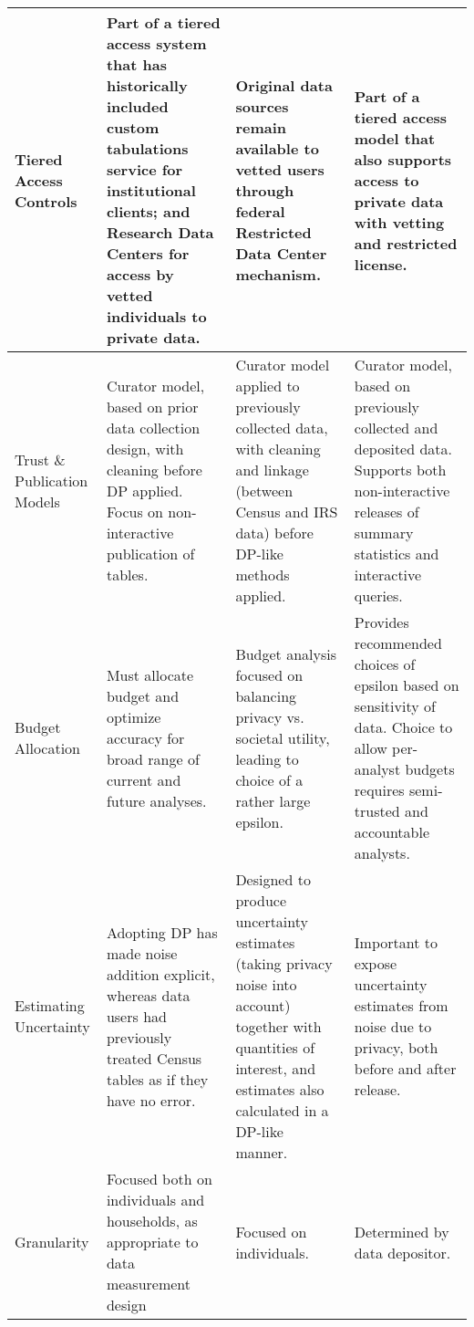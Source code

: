 \begin{table}[p]
\begin{tabularx}{1\textwidth}{P{.45in}YYY}
\midrule
Tiered Access Controls &
Part of a tiered access system that has historically included custom tabulations service for institutional clients; and Research Data Centers for access by vetted individuals to private data. &
Original data sources remain available to vetted users through federal Restricted Data Center mechanism. &
 Part of a tiered access model that also supports access to private data with vetting and restricted license. \\
\midrule
Trust \& Publication Models &
Curator model, based on prior data collection design, with cleaning before DP applied. Focus on non-interactive publication of tables. &
Curator model applied to previously collected data, with cleaning and linkage (between Census and IRS data) before DP-like methods applied. &
Curator model, based on previously collected and deposited data. Supports both non-interactive releases of summary statistics and interactive queries. \\
\midrule
Budget Allocation &
Must allocate budget and optimize accuracy for broad range of current and  future  analyses. &
Budget analysis focused on balancing privacy vs. societal utility, leading to choice of a rather large epsilon. &
Provides recommended choices of epsilon based on sensitivity of data. Choice to allow per-analyst budgets requires semi-trusted and accountable analysts.\\
\midrule
Estimating Uncertainty &
Adopting DP has made noise addition explicit, whereas data users had previously treated Census tables as if they have no error. &
Designed to produce uncertainty estimates (taking privacy noise into account) together with quantities of interest, and estimates also calculated in a DP-like manner. &
Important to expose uncertainty estimates from noise due to privacy, both before and after release.\\
\midrule
Granularity &
Focused both on individuals and households, as appropriate to data measurement design &
Focused on individuals. &
Determined by data depositor.\\
\bottomrule


\end{tabularx}


\end{table}